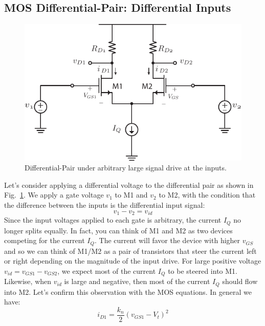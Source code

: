 \subsection{MOS Differential-Pair:  Differential Inputs}
\begin{figure}[tb]
\centering
\includegraphics[scale=1]{Diffamp_large_signal.pdf}
\caption{Differential-Pair under arbitrary large signal drive at the inputs.}
\label{fig:Diff_amp_large.pdf}
\end{figure}
Let's consider applying a differential voltage to the differential pair as shown in Fig.~\ref{fig:Diff_amp_large.pdf}.  We apply a gate voltage $v_1$ to M1 and $v_2$ to M2, with the condition that the difference between the inputs is the differential input signal:
    \begin{equation}
        v_1 - v_2 = v_{id}
    \end{equation}
Since the input voltages applied to each gate is arbitrary, the current $I_Q$ no longer splits equally.  In fact, you can think of M1 and M2 as two devices competing for the current $I_Q$.  The current will favor the device with higher $v_{GS}$ and so we can think of M1/M2 as a pair of transistors that steer the current left or right depending on the magnitude of the input drive.  For large positive voltage $v_{id} = v_{GS1} - v_{GS2}$, we expect most of the current $I_Q$ to be steered into M1.  Likewise, when $v_{id}$ is large and negative, then most of the current $I_Q$ should flow into M2.  Let's confirm this observation with the MOS equations.  In general we have:
    \begin{equation}
        {i_{D1}} = \frac{{{k_n}}}{2}{\left( {{v_{GS1}} - {V_t}} \right)^2}
    \end{equation}
